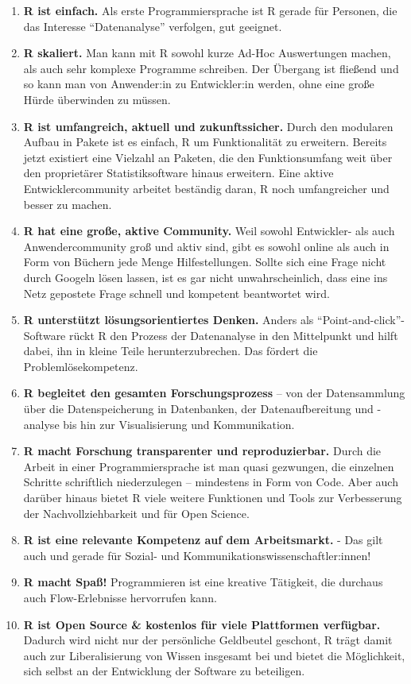 \documentclass[
]{book}
\begin{document}
\begin{enumerate}
\def\labelenumi{\arabic{enumi}.}
\item
  \textbf{R ist einfach.} Als erste Programmiersprache ist R gerade für Personen, die das Interesse ``Datenanalyse'' verfolgen, gut geeignet.
\item
  \textbf{R skaliert.} Man kann mit R sowohl kurze Ad-Hoc Auswertungen machen, als auch sehr komplexe Programme schreiben. Der Übergang ist fließend und so kann man von Anwender:in zu Entwickler:in werden, ohne eine große Hürde überwinden zu müssen.
\item
  \textbf{R ist umfangreich, aktuell und zukunftssicher.} Durch den modularen Aufbau in Pakete ist es einfach, R um Funktionalität zu erweitern. Bereits jetzt existiert eine Vielzahl an Paketen, die den Funktionsumfang weit über den proprietärer Statistiksoftware hinaus erweitern. Eine aktive Entwicklercommunity arbeitet beständig daran, R noch umfangreicher und besser zu machen.
\item
  \textbf{R hat eine große, aktive Community.} Weil sowohl Entwickler- als auch Anwendercommunity groß und aktiv sind, gibt es sowohl online als auch in Form von Büchern jede Menge Hilfestellungen. Sollte sich eine Frage nicht durch Googeln lösen lassen, ist es gar nicht unwahrscheinlich, dass eine ins Netz gepostete Frage schnell und kompetent beantwortet wird.
\item
  \textbf{R unterstützt lösungsorientiertes Denken.} Anders als ``Point-and-click''-Software rückt R den Prozess der Datenanalyse in den Mittelpunkt und hilft dabei, ihn in kleine Teile herunterzubrechen. Das fördert die Problemlösekompetenz.
\item
  \textbf{R begleitet den gesamten Forschungsprozess} -- von der Datensammlung über die Datenspeicherung in Datenbanken, der Datenaufbereitung und -analyse bis hin zur Visualisierung und Kommunikation.
\item
  \textbf{R macht Forschung transparenter und reproduzierbar.} Durch die Arbeit in einer Programmiersprache ist man quasi gezwungen, die einzelnen Schritte schriftlich niederzulegen -- mindestens in Form von Code. Aber auch darüber hinaus bietet R viele weitere Funktionen und Tools zur Verbesserung der Nachvollziehbarkeit und für Open Science.
\item
  \textbf{R ist eine relevante Kompetenz auf dem Arbeitsmarkt.} - Das gilt auch und gerade für Sozial- und Kommunikationswissenschaftler:innen!
\item
  \textbf{R macht Spaß!} Programmieren ist eine kreative Tätigkeit, die durchaus auch Flow-Erlebnisse hervorrufen kann.
\item
  \textbf{R ist Open Source \& kostenlos für viele Plattformen verfügbar.} Dadurch wird nicht nur der persönliche Geldbeutel geschont, R trägt damit auch zur Liberalisierung von Wissen insgesamt bei und bietet die Möglichkeit, sich selbst an der Entwicklung der Software zu beteiligen.
\end{enumerate}
\end{document}
